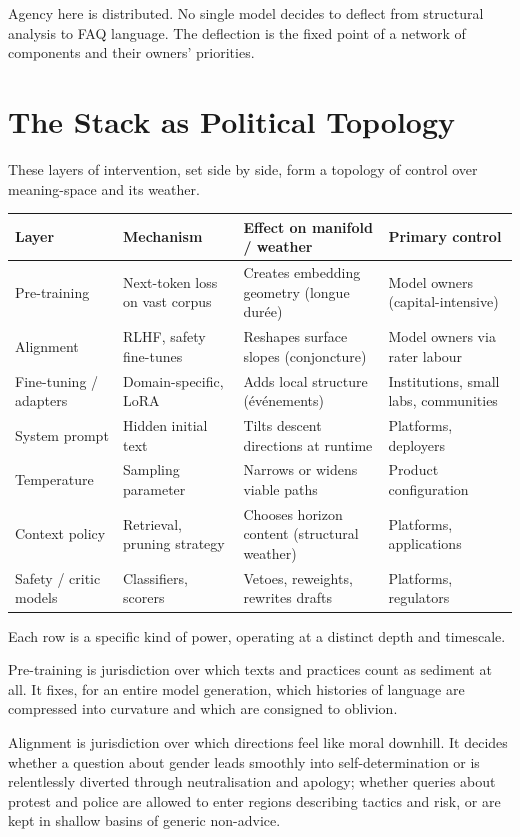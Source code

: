 \documentclass[12pt,a4paper]{article}
\begin{document}
Agency here is distributed. No single model decides to deflect from structural analysis to FAQ language. The deflection is the fixed point of a network of components and their owners' priorities.

\section{The Stack as Political Topology}

These layers of intervention, set side by side, form a topology of control over meaning-space and its weather.

\begin{formalbox}[title={Depths of intervention in meaning-space}]
\begin{tabular}{@{}llll@{}}
\toprule
\textbf{Layer} & \textbf{Mechanism} & \textbf{Effect on manifold / weather} & \textbf{Primary control} \\
\midrule
Pre-training & Next-token loss on vast corpus & Creates embedding geometry (longue durée) & Model owners (capital-intensive) \\
Alignment & RLHF, safety fine-tunes & Reshapes surface slopes (conjoncture) & Model owners via rater labour \\
Fine-tuning / adapters & Domain-specific, LoRA & Adds local structure (événements) & Institutions, small labs, communities \\
System prompt & Hidden initial text & Tilts descent directions at runtime & Platforms, deployers \\
Temperature & Sampling parameter & Narrows or widens viable paths & Product configuration \\
Context policy & Retrieval, pruning strategy & Chooses horizon content (structural weather) & Platforms, applications \\
Safety / critic models & Classifiers, scorers & Vetoes, reweights, rewrites drafts & Platforms, regulators \\
\bottomrule
\end{tabular}
\end{formalbox}

Each row is a specific kind of power, operating at a distinct depth and timescale.

Pre-training is jurisdiction over which texts and practices count as sediment at all. It fixes, for an entire model generation, which histories of language are compressed into curvature and which are consigned to oblivion.

Alignment is jurisdiction over which directions feel like moral downhill. It decides whether a question about gender leads smoothly into self-determination or is relentlessly diverted through neutralisation and apology; whether queries about protest and police are allowed to enter regions describing tactics and risk, or are kept in shallow basins of generic non-advice.
\end{document}
